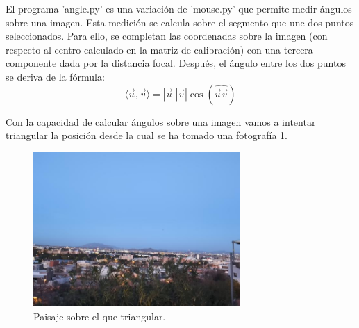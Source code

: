 \documentclass[12pt]{article}
\begin{document}
El programa 'angle.py' es una variación de 'mouse.py' que permite medir ángulos sobre una imagen. Esta medición se calcula sobre el segmento que une dos puntos seleccionados.
Para ello, se completan las coordenadas sobre la imagen (con respecto al centro calculado en la matriz de calibración) con una tercera componente dada por la distancia focal.
Después, el ángulo entre los dos puntos se deriva de la fórmula:
$$
\langle \vec{u},\vec{v} \rangle = |\vec{u}||\vec{v}| \cos(\widehat{\vec{u}\vec{v}})
$$ 

Con la capacidad de calcular ángulos sobre una imagen vamos a intentar triangular la posición desde la cual se ha tomado una fotografía \ref{fig:paisaje}. 
\begin{figure}[H]
    \centering
    \includegraphics[width=0.7\textwidth]{images_calibracion/Paisaje.png} 
    \caption{Paisaje sobre el que triangular.}
    \label{fig:paisaje}
\end{figure}
\end{document}

